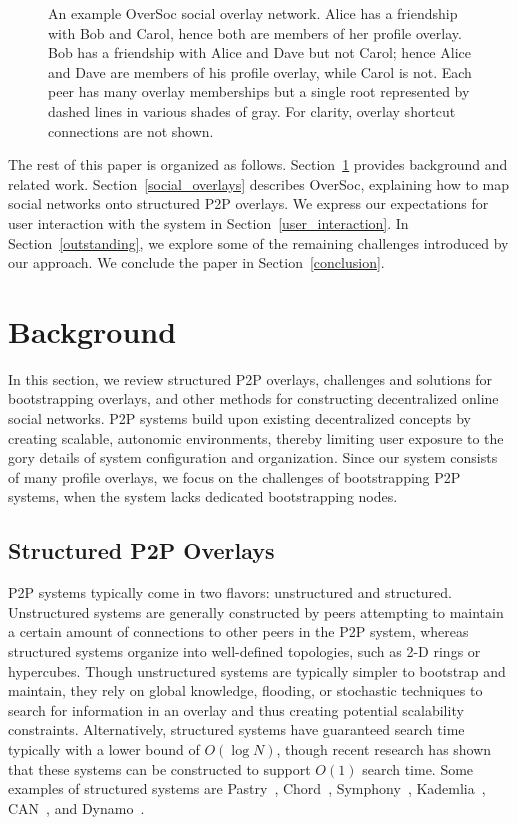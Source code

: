 \documentclass{sig-alternate}
\begin{document}
\begin{figure}[h]
\centering
{}
\caption{An example OverSoc social overlay network.  Alice has a friendship
with Bob and Carol, hence both are members of her profile overlay. Bob has a
friendship with Alice and Dave but not Carol; hence Alice and Dave are members
of his profile overlay, while Carol is not.  Each peer has many overlay
memberships but a single root represented by dashed lines in various shades of
gray.  For clarity, overlay shortcut connections are not shown.}
\label{fig:system}
\end{figure}

The rest of this paper is organized as follows.  Section~\ref{background}
provides background and related work.  Section~\ref{social_overlays} describes
OverSoc, explaining how to map social networks onto structured P2P overlays.
We express our expectations for user interaction with the system in
Section~\ref{user_interaction}.  In Section~\ref{outstanding}, we explore some
of the remaining challenges introduced by our approach.  We conclude the paper
in Section~\ref{conclusion}.

\section{Background}
\label{background}

In this section, we review structured P2P overlays, challenges and solutions
for bootstrapping overlays, and other methods for constructing decentralized
online social networks.  P2P systems build upon existing decentralized concepts
by creating scalable, autonomic environments, thereby limiting user exposure to
the gory details of system configuration and organization.  Since our system
consists of many profile overlays, we focus on the challenges of bootstrapping
P2P systems, when the system lacks dedicated bootstrapping nodes.

\subsection{Structured P2P Overlays}

P2P systems typically come in two flavors:  unstructured and structured.
Unstructured systems are generally constructed by peers attempting to maintain
a certain amount of connections to other peers in the P2P system, whereas
structured systems organize into well-defined topologies, such as 2-D rings or
hypercubes.  Though unstructured systems are typically simpler to bootstrap and
maintain, they rely on global knowledge, flooding, or stochastic techniques to
search for information in an overlay and thus creating potential scalability
constraints.  Alternatively, structured systems have guaranteed search time
typically with a lower bound of $O(\log N)$, though recent research has shown
that these systems can be constructed to support $O(1)$ search time.  Some
examples of structured systems are Pastry~\cite{pastry}, Chord~\cite{chord},
Symphony~\cite{symphony}, Kademlia~\cite{kademlia}, CAN~\cite{can}, and
Dynamo~\cite{dynamo}.
\end{document}
